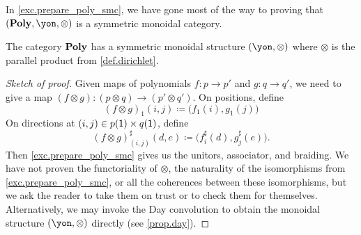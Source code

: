 \documentclass[Book-Poly]{subfiles}
\begin{document}
In \cref{exc.prepare_poly_smc}, we have gone most of the way to proving that $(\poly,\yon,\otimes)$ is a symmetric monoidal category. 

\begin{proposition}\label{prop.dirichlet_monoidal}
The category $\mathbf{Poly}$ has a symmetric monoidal structure $(\yon,\otimes)$ where $\otimes$ is the parallel product from \cref{def.dirichlet}.
\end{proposition}
\begin{proof}[Sketch of proof]
Given maps of polynomials $f\colon p\to p'$ and $g\colon q\to q'$, we need to give a map $(f\otimes g)\colon (p\otimes q)\to (p'\otimes q')$. On positions, define
\[
(f\otimes g)_1(i,j)\coloneqq \big(f_1(i),g_1(j)\big)
\]
On directions at $(i,j)\in p(\textsf{1})\times q(\textsf{1})$, define
\[
  (f\otimes g)^\sharp_{(i,j)}(d,e)\coloneqq
  \big(f^\sharp_i(d),g^\sharp_j(e)\big).
\]
Then \cref{exc.prepare_poly_smc} gives us the unitors, associator, and braiding.
We have not proven the functoriality of $\otimes$, the naturality of the isomorphisms from \cref{exc.prepare_poly_smc}, or all the coherences between these isomorphisms, but we ask the reader to take them on trust or to check them for themselves.
Alternatively, we may invoke the Day convolution to obtain the monoidal structure $(\yon, \otimes)$ directly (see \cref{prop.day}).
\end{proof}
\end{document}
